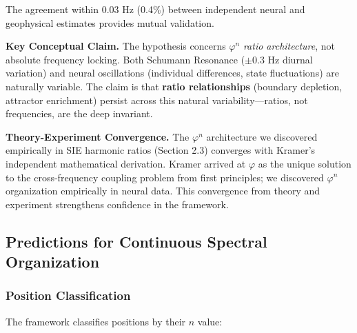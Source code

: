 \documentclass[11pt,a4paper]{article}
\newcommand{\phisym}{\varphi}
\begin{document}
The agreement within 0.03 Hz (0.4\%) between independent neural and geophysical estimates provides mutual validation.

\textbf{Key Conceptual Claim.}
The hypothesis concerns $\phisym^n$ \textit{ratio architecture}, not absolute frequency locking. Both Schumann Resonance ($\pm 0.3$ Hz diurnal variation) and neural oscillations (individual differences, state fluctuations) are naturally variable. The claim is that \textbf{ratio relationships} (boundary depletion, attractor enrichment) persist across this natural variability---ratios, not frequencies, are the deep invariant.

\textbf{Theory-Experiment Convergence.}
The $\phisym^n$ architecture we discovered empirically in SIE harmonic ratios (Section 2.3) converges with Kramer's \parencite{kramer2022golden} independent mathematical derivation. Kramer arrived at $\phisym$ as the unique solution to the cross-frequency coupling problem from first principles; we discovered $\phisym^n$ organization empirically in neural data. This convergence from theory and experiment strengthens confidence in the framework.

\subsection{Predictions for Continuous Spectral Organization}

\subsubsection{Position Classification}
The framework classifies positions by their $n$ value:
\end{document}
